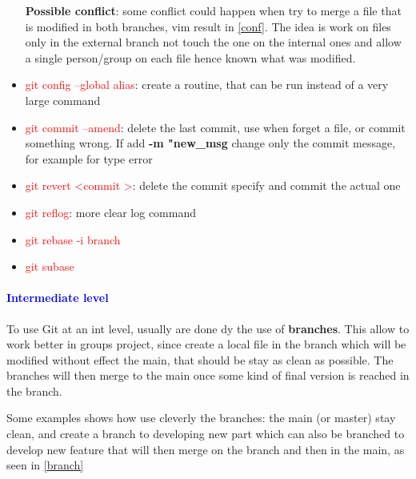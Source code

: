 \documentclass{report}
\begin{document}
\begin{itemize}
     \textbf{Possible conflict}: some conflict could happen when try to merge a file that is modified in both branches, vim result in \autoref{conf}. The idea is work on files only in the external branch not touch the one on the internal ones and allow a single person/group on each file hence known what was modified.
     \item \textcolor{red}{git config --global alias}: create a routine, that can be run instead of a very large command
    \item \textcolor{red}{git commit --amend}: delete the last commit, use when forget a file, or commit something wrong. If add \textbf{-m "new\_msg} change only the commit message, for example for type error
    \item \textcolor{red}{git revert \textless commit \textgreater}: delete the commit specify and commit the actual one 
    \item \textcolor{red}{git reflog}: more clear log command 
    \item \textcolor{red}{git rebase -i branch}
    \item \textcolor{red}{git subase}
\end{itemize}

\paragraph*{\textcolor{blue}{Intermediate level}}
To use Git at an int level, usually are done dy the use of \textbf{branches}. This allow to work better in groups project, since create a local file in the branch which will be modified without effect the main, that should be stay as clean as possible. The branches will then merge to the main once some kind of final version is reached in the branch. 

Some examples shows how use cleverly the branches: the main (or master) stay clean, and create a branch to developing new part which can also be branched 
to develop new feature that will then merge on the branch and then in the main, as seen in \autoref{branch} 
\end{document}

